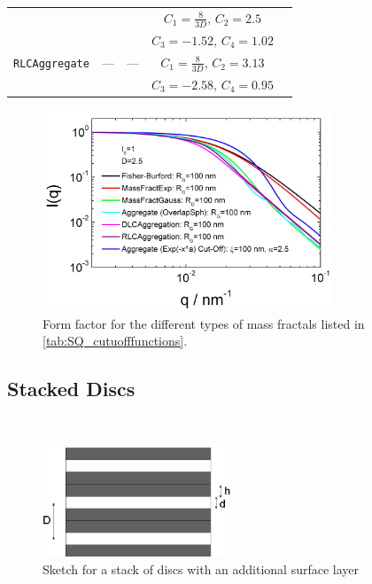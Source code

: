 \begin{table}[htb]
\begin{tabular}{|c|c|c|c|c|}
                                          & & & $\scriptstyle C_1=\frac{8}{3D}, \, C_2=2.5$ & \\
                                          & & & $\scriptstyle C_3=-1.52, \, C_4=1.02$ & \\[3mm]
   {\tt \scriptsize RLCAggregate} & --- & --- & $\scriptstyle C_1=\frac{8}{3D}, \, C_2=3.13$ & \\
                                          & & & $\scriptstyle C_3=-2.58, \, C_4=0.95$ & \cite{Lin1990c}\\[3mm]
  \hline
\end{tabular}
\end{table}


\begin{figure}[htb]
\begin{center}
\includegraphics[width=0.768\textwidth]{../images/form_factor/cluster/AggregateComparison.png}
\end{center}
\caption{Form factor for the different types of mass fractals listed in \ref{tab:SQ_cutuofffunctions}.}
\label{fig:FFCluster}
\end{figure}



\clearpage
\subsection{Stacked Discs \cite{Kratky1949,Frielinghaus2017,Vaia2002,Hanley2003}}
\label{sect:StackedDiscs}
~\\

\begin{figure}[htb]
\begin{center}
\includegraphics[width=0.5\textwidth]{../images/form_factor/cluster/stackdiscs.png}
\end{center}
\caption{Sketch for a stack of discs with an additional surface layer}
\label{stackeddiscs}
\end{figure}



